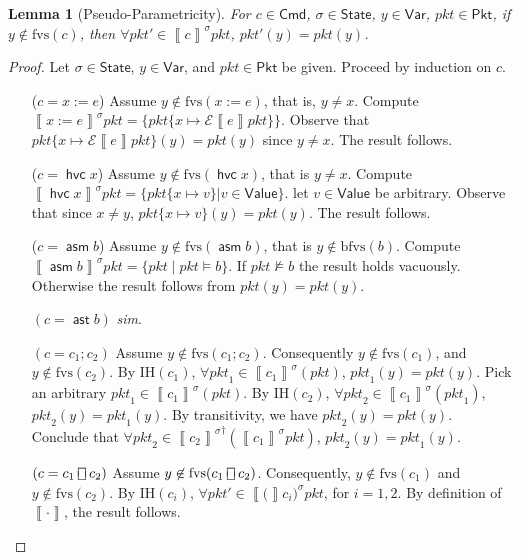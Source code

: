 \documentclass{article}
\newcommand{\pkt}{\mathit{pkt}}
\newcommand{\denote}[1]{\left\llbracket#1\right\rrbracket}
\newcommand{\edenote}[1]{\mathcal{E}\denote{#1}}
\newcommand{\Value}{\mathsf{Value}}
\newcommand{\Cmd}{\mathsf{Cmd}}
\newcommand{\Pkt}{\mathsf{Pkt}}
\newcommand{\Var}{\mathsf{Var}}
\newcommand{\State}{\mathsf{State}}
\newcommand{\assert}{\mathop{\mathsf{ast}}}
\newcommand{\assume}{\mathop{\mathsf{asm}}}
\newcommand{\choiceop}{\rotatebox[origin=c]{90}{$\sqsubset\!\!\!\sqsupset$}}
\newcommand{\choice}{\mathbin{\choiceop}}
\newcommand{\havoc}[1]{\mathop{\mathsf{hvc}}#1}
\newcommand{\fvs}{\textrm{fvs}}
\newcommand{\bfvs}{\textrm{bfvs}}
\theoremstyle{plain}
\newtheorem{lemma}{Lemma}
\theoremstyle{definition}
\theoremstyle{remark}
\begin{document}
\begin{lemma}[Pseudo-Parametricity]
  \label{lem:parametricity}
  For $c \in \Cmd$, $\sigma \in \State$, $y \in \Var$, $\pkt \in \Pkt$, if $y
  \not\in \fvs(c)$, then $\forall \pkt' \in \denote{c}^\sigma \pkt$, $\pkt'(y) =
  \pkt(y)$.
\end{lemma}

\begin{proof}
  Let $\sigma \in \State $, $y \in \Var$, and $\pkt \in \Pkt$ be given.
  Proceed by induction on $c$.
  \begin{enumerate}[align=left]
  \item[($c = x := e$)] Assume $y \not \in \fvs(x:=e)$, that is, $y \neq x$.
    Compute $\denote{x:=e}^\sigma \pkt = \{\pkt\{ x \mapsto \edenote e
    \pkt\}\}$. Observe that $\pkt\{ x \mapsto \edenote e \pkt\}(y) = \pkt(y)$
    since $y \neq x$. The result follows.

  \item[($c = \havoc x$)] Assume $y \not \in \fvs(\havoc x)$, that is $y \neq
    x$. Compute $\denote{\havoc x}^\sigma\pkt = \{\pkt\{x \mapsto v\} | v \in
    \Value\}$. let $v \in \Value$ be arbitrary. Observe that since $x \neq y$,
    $\pkt\{x \mapsto v\}(y) = \pkt(y)$. The result follows.

  \item[($c = \assume b$)] Assume $y \not \in \fvs(\assume b)$, that is $y
    \not\in \bfvs(b)$. Compute $\denote{\assume b}^\sigma \pkt = \{\pkt \mid
    \pkt \models b\}$. If $\pkt \not\models b$ the result holds vacuously.
    Otherwise the result follows from $\pkt(y) = \pkt(y)$.

  \item[$(c = \assert b)$] \textit{sim}.

  \item[$(c = c_1;c_2)$] Assume $y \not \in \fvs(c_1;c_2)$. Consequently $y
    \not\in \fvs(c_1)$, and $y \not \in \fvs(c_2)$. By IH$(c_1)$, $\forall
    \pkt_1 \in \denote{c_1}^\sigma(\pkt)$, $\pkt_1(y) = pkt(y)$. Pick an
    arbitrary $\pkt_1 \in \denote{c_1}^\sigma(\pkt)$. By IH$(c_2)$, $\forall
    \pkt_2 \in \denote{c_1}^\sigma(\pkt_1)$, $\pkt_2(y) = \pkt_1(y)$. By
    transitivity, we have $\pkt_2(y) = \pkt(y)$. Conclude that $\forall \pkt_2
    \in {\denote{c_2}^\sigma}^\dagger (\denote{c_1}^\sigma \pkt)$, $\pkt_2(y) =
    \pkt_1(y)$.

  \item[$(c = c_1 \choice c_2)$] Assume $y \not \in \fvs(c_1 \choice c_2)$.
    Consequently, $y \not \in \fvs(c_1)$ and $y \not \in \fvs(c_2)$.
    By IH$(c_i)$, $\forall \pkt' \in \denote(c_i)^\sigma\pkt$, for $i = 1,2$.
    By definition of $\denote{\cdot}$, the result follows.


\end{enumerate}
\end{proof}
\end{document}
